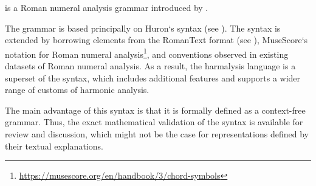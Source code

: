 

 is a Roman numeral analysis grammar
introduced by \textcite{napoleslopez2020harmalysis}.

The  grammar is based principally on
Huron‘s  syntax (see ). The syntax
is extended by borrowing elements from the RomanText format
(see ), MuseScore‘s notation for Roman
numeral
analysis\footnote{\href{https://musescore.org/en/handbook/3/chord-symbols\#rna}{https://musescore.org/en/handbook/3/chord-symbols}},
and conventions observed in existing datasets of Roman
numeral analysis.  As  a result,  the harmalysis language is
a superset  of  the  syntax,  which includes
additional features and supports a wider range of customs of
harmonic analysis.

The main advantage of this syntax is that it is formally defined as a context-free grammar. Thus, the exact mathematical validation of the syntax is available for review and discussion, which might not be the case for representations defined by their textual explanations.
